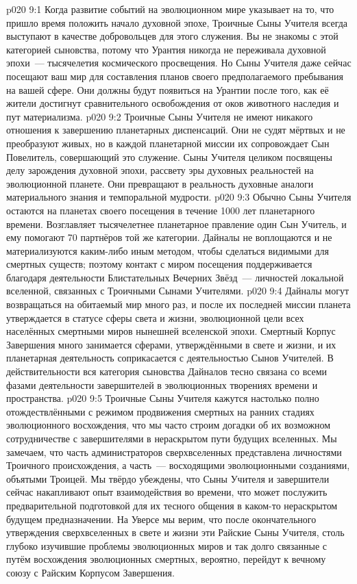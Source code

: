 \vs p020 9:1 Когда развитие событий на эволюционном мире указывает на то, что пришло время положить начало духовной эпохе, Троичные Сыны Учителя всегда выступают в качестве добровольцев для этого служения. Вы не знакомы с этой категорией сыновства, потому что Урантия никогда не переживала духовной эпохи~--- тысячелетия космического просвещения. Но Сыны Учителя даже сейчас посещают ваш мир для составления планов своего предполагаемого пребывания на вашей сфере. Они должны будут появиться на Урантии после того, как её жители достигнут сравнительного освобождения от оков животного наследия и пут материализма.
\vs p020 9:2 Троичные Сыны Учителя не имеют никакого отношения к завершению планетарных диспенсаций. Они не судят мёртвых и не преобразуют живых, но в каждой планетарной миссии их сопровождает Сын Повелитель, совершающий это служение. Сыны Учителя целиком посвящены делу зарождения духовной эпохи, рассвету эры духовных реальностей на эволюционной планете. Они превращают в реальность духовные аналоги материального знания и темпоральной мудрости.
\vs p020 9:3 Обычно Сыны Учителя остаются на планетах своего посещения в течение 1000 лет планетарного времени. Возглавляет тысячелетнее планетарное правление один Сын Учитель, и ему помогают 70 партнёров той же категории. Дайналы не воплощаются и не материализуются каким\hyp{}либо иным методом, чтобы сделаться видимыми для смертных существ; поэтому контакт с миром посещения поддерживается благодаря деятельности Блистательных Вечерних Звёзд~--- личностей локальной вселенной, связанных с Троичными Сынами Учителями.
\vs p020 9:4 Дайналы могут возвращаться на обитаемый мир много раз, и после их последней миссии планета утверждается в статусе сферы света и жизни, эволюционной цели всех населённых смертными миров нынешней вселенской эпохи. Смертный Корпус Завершения много занимается сферами, утверждёнными в свете и жизни, и их планетарная деятельность соприкасается с деятельностью Сынов Учителей. В действительности вся категория сыновства Дайналов тесно связана со всеми фазами деятельности завершителей в эволюционных творениях времени и пространства.
\vs p020 9:5 \pc Троичные Сыны Учителя кажутся настолько полно отождествлёнными с режимом продвижения смертных на ранних стадиях эволюционного восхождения, что мы часто строим догадки об их возможном сотрудничестве с завершителями в нераскрытом пути будущих вселенных. Мы замечаем, что часть администраторов сверхвселенных представлена личностями Троичного происхождения, а часть~--- восходящими эволюционными созданиями, объятыми Троицей. Мы твёрдо убеждены, что Сыны Учителя и завершители сейчас накапливают опыт взаимодействия во времени, что может послужить предварительной подготовкой для их тесного общения в каком\hyp{}то нераскрытом будущем предназначении. На Уверсе мы верим, что после окончательного утверждения сверхвселенных в свете и жизни эти Райские Сыны Учителя, столь глубоко изучившие проблемы эволюционных миров и так долго связанные с путём восхождения эволюционных смертных, вероятно, перейдут к вечному союзу с Райским Корпусом Завершения.
